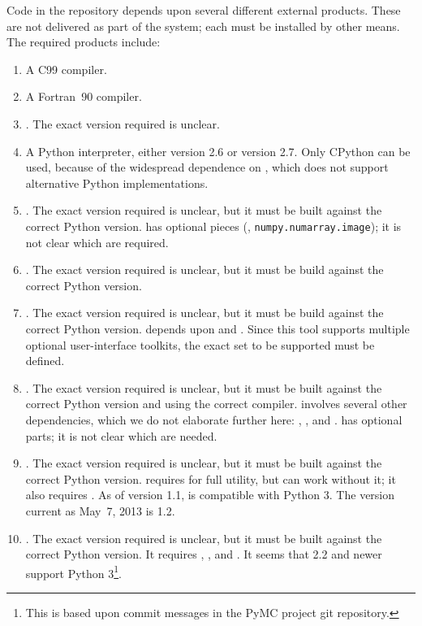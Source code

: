 \documentclass[draftmode,draftwater]{memarticle}
\newcommand{\despipe}{\name{des-pipe}\xspace}
\begin{document}
Code in the \despipe repository depends upon several different
external products. These are not delivered as part of the
\despipe system; each must be installed by other means. The
required products include:
\begin{enumerate}
\item A C99 compiler.
\item A Fortran~90 compiler.
\item {}. The exact version required is unclear.
\item A Python interpreter, either version 2.6 or version 2.7. Only
  CPython can be used, because of the widespread dependence on
  , which does not support alternative Python
  implementations.
\item {}. The exact version required is unclear, but it must
  be built against the correct Python version.  has optional
  pieces (\eg, \texttt{numpy.numarray.image}); it is not clear which are
  required.
\item {}. The exact version required is unclear, but it must
  be build against the correct Python version.
\item {}. The exact version required is unclear, but it
  must be build against the correct Python version. 
  depends upon  and . Since this tool
  supports multiple optional user-interface toolkits, the exact set to
  be supported must be defined.
\item {}. The exact version required is unclear, but it must
  be built against the correct Python version and using the correct
  \cpp{} compiler.  involves several other dependencies,
  which we do not elaborate further here: ,
  , and .  has optional parts; it is
  not clear which are needed.
\item {}. The exact version required is unclear, but it must
  be built against the correct Python version.  requires
   for full utility, but can work without it; it also
  requires . As of version 1.1,  is compatible
  with Python 3. The version current as May~7, 2013 is 1.2.
\item {}. The exact version required is unclear, but it must be
  built against the correct Python version. It requires ,
  , and . It seems that  2.2 and
  newer support Python 3\footnote{This is based upon commit messages in
    the PyMC project git repository.}.
\end{enumerate}
\end{document}
